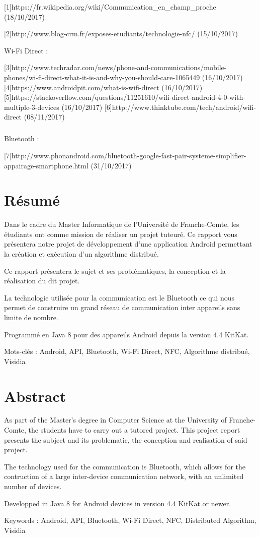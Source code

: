 \documentclass[a4paper,10pt]{report}
\begin{document}
 [1]https://fr.wikipedia.org/wiki/Communication_en_champ_proche
 (18/10/2017)
 
 [2]http://www.blog-crm.fr/exposes-etudiants/technologie-nfc/
 (15/10/2017)
 
 
\newline
 Wi-Fi Direct :

 [3]http://www.techradar.com/news/phone-and-communications/mobile-phones/wi-fi-direct-what-it-is-and-why-you-should-care-1065449 (16/10/2017)
 [4]https://www.androidpit.com/what-is-wifi-direct (16/10/2017)
 [5]https://stackoverflow.com/questions/11251610/wifi-direct-android-4-0-with-multiple-3-devices (16/10/2017)
 [6]http://www.thinktube.com/tech/android/wifi-direct (08/11/2017)
 
 \paragraph{}
 Bluetooth :

 [7]http://www.phonandroid.com/bluetooth-google-fast-pair-systeme-simplifier-appairage-smartphone.html (31/10/2017)
 
 \chapter*{Résumé}
 Dans le cadre du Master Informatique de l'Université de Franche-Comte, les étudiants ont comme mission de réaliser un projet tuteuré. Ce rapport vous présentera notre projet de développement d'une application Android permettant la création et exécution d'un algorithme distribué.
 
 Ce rapport présentera le sujet et ses problématiques, la conception et la réalisation du dit projet.
 
 La technologie utilisée pour la communication est le Bluetooth ce qui nous permet de construire un grand réseau de communication inter appareils sans limite de nombre.
 
 Programmé en Java 8 pour des appareils Android depuis la version 4.4 KitKat.
 
 Mots-clés : Android, API, Bluetooth, Wi-Fi Direct, NFC, Algorithme distribué, Visidia
 
 \chapter*{Abstract}
 As part of the Master's degree in Computer Science at the University of Franche-Comte, the students have to carry out a tutored project. This project report presents the subject and its problematic, the conception and realisation of said project.
 
 The technology used for the communication is Bluetooth, which allows for the contruction of a large inter-device communication network, with an unlimited number of devices.
 
 Developped in Java 8 for Android devices in version 4.4 KitKat or newer.
 
 Keywords : Android, API, Bluetooth, Wi-Fi Direct, NFC, Distributed Algorithm, Visidia
\end{document}
